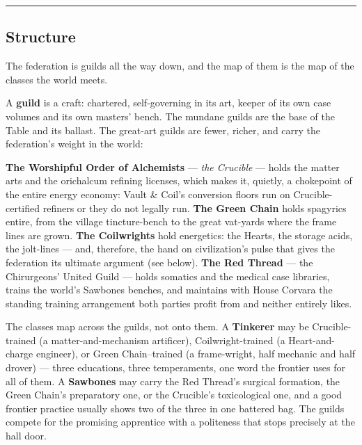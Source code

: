 \medskip\hrule\medskip

\subsection{Structure}

The federation is guilds all the way down, and the map of them is the map of the classes the world meets.

A \textbf{guild} is a craft: chartered, self-governing in its art, keeper of its own case volumes and its own masters' bench. The mundane guilds are the base of the Table and its ballast. The great-art guilds are fewer, richer, and carry the federation's weight in the world:

\textbf{The Worshipful Order of Alchemists} --- \textit{the Crucible} --- holds the matter arts and the orichalcum refining licenses, which makes it, quietly, a chokepoint of the entire energy economy: Vault \& Coil's conversion floors run on Crucible-certified refiners or they do not legally run. \textbf{The Green Chain} holds spagyrics entire, from the village tincture-bench to the great vat-yards where the frame lines are grown. \textbf{The Coilwrights} hold energetics: the Hearts, the storage acids, the jolt-lines --- and, therefore, the hand on civilization's pulse that gives the federation its ultimate argument (see below). \textbf{The Red Thread} --- the Chirurgeons' United Guild --- holds somatics and the medical case libraries, trains the world's Sawbones benches, and maintains with House Corvara the standing training arrangement both parties profit from and neither entirely likes.

The classes map across the guilds, not onto them. A \textbf{Tinkerer} may be Crucible-trained (a matter-and-mechanism artificer), Coilwright-trained (a Heart-and-charge engineer), or Green Chain--trained (a frame-wright, half mechanic and half drover) --- three educations, three temperaments, one word the frontier uses for all of them. A \textbf{Sawbones} may carry the Red Thread's surgical formation, the Green Chain's preparatory one, or the Crucible's toxicological one, and a good frontier practice usually shows two of the three in one battered bag. The guilds compete for the promising apprentice with a politeness that stops precisely at the hall door.

